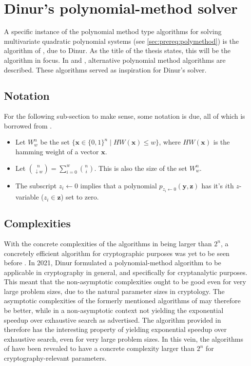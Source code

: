 \section{Dinur's polynomial-method solver} \label{sec:dinur}

A specific instance of the polynomial method type algorithms for solving multivariate quad\-ratic polynomial systems (see \cref{sec:prereq:polymethod}) is the algorithm of \cite{eurocrypt-2021-30841}, due to Dinur. As the title of the thesis states, this will be the algorithm in focus. In \cite{doi:10.1137/1.9781611974782.143} and \cite{Williams2014ThePM}, alternative polynomial method algorithms are described. These algorithms served as inspiration for Dinur's solver.

\subsection{Notation} \label{sec:dinur:notation}

For the following sub-section to make sense, some notation is due, all of which is borrowed from \cite{eurocrypt-2021-30841}.
\begin{itemize}
    \item Let $W^n_w$ be the set $\{\mathbf{x} \in \{0, 1\}^n \mid HW(\mathbf{x}) \leq w \}$, where $HW(\mathbf{x})$ is the hamming weight of a vector $\mathbf{x}$. 
    \item Let $\binom{n}{\downarrow w} = \sum^w_{i = 0} \binom{n}{i}$. This is also the size of the set $W^n_w$.
    \item The subscript $z_i \leftarrow 0$ implies that a polynomial $p_{z_i \leftarrow 0}(\mathbf{y},\mathbf{z})$ has it's $i$th $z$-variable ($z_i \in \mathbf{z}$) set to zero.
\end{itemize}

\subsection{Complexities}

With the concrete complexities of the algorithms in \cite{doi:10.1137/1.9781611974782.143, Williams2014ThePM} being larger than $2^n$, a concretely efficient algorithm for cryptographic purposes was yet to be seen before \cite{eurocrypt-2021-30841}. In 2021, Dinur formulated a polynomial-method algorithm to be applicable in cryptography in general, and specifically for cryptanalytic purposes. This meant that the non-asymptotic complexities ought to be good even for very large problem sizes, due to the natural parameter sizes in cryptology. The asymptotic complexities of the formerly mentioned algorithms of \cite{doi:10.1137/1.9781611974782.143, Williams2014ThePM} may therefore be better, while in a non-asymptotic context not yielding the exponential speedup over exhaustive search as advertised. The algorithm provided in \cite{eurocrypt-2021-30841} therefore has the interesting property of yielding exponential speedup over exhaustive search, even for very large problem sizes. In this vein, the algorithms of \cite{doi:10.1137/1.9781611974782.143, Williams2014ThePM} have been revealed to have a concrete complexity larger than $2^n$ for cryptography-relevant parameters.

